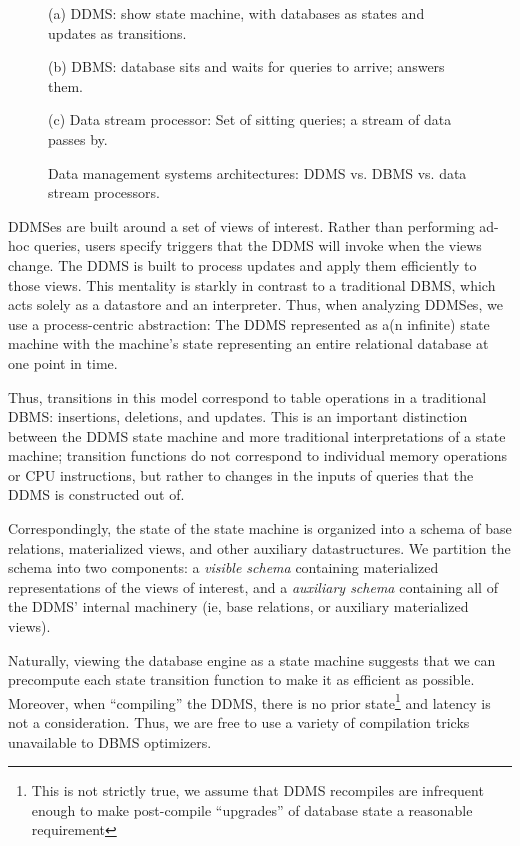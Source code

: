 \begin{figure}
(a) DDMS: show state machine, with databases as states and updates as transitions.

(b) DBMS: database sits and waits for queries to arrive; answers them.

(c) Data stream processor: Set of sitting queries; a stream of data passes by.

\caption{Data management systems architectures: DDMS vs. DBMS vs. data stream processors.}
\end{figure}


DDMSes are built around a set of views of interest.  Rather than performing
ad-hoc queries, users specify triggers that the DDMS will invoke when the views
change.  The DDMS is built to process updates and apply them efficiently to
those views.  This mentality is starkly in contrast to a traditional DBMS, which
acts solely as a datastore and an interpreter.  Thus, when analyzing DDMSes, we
use a process-centric abstraction: The DDMS represented as a(n infinite) state
machine with the machine's state representing an entire relational database at
one point in time.


Thus, transitions in this model correspond to table operations in a traditional
DBMS: insertions, deletions, and updates.  This is an important distinction
between the DDMS state machine and more traditional interpretations of a state
machine; transition functions do not correspond to individual memory operations
or CPU instructions, but rather to changes in the inputs of queries that the
DDMS is constructed out of.

Correspondingly, the state of the state machine is organized into a schema of
base relations, materialized views, and other auxiliary datastructures.  We
partition the schema into two components: a \textit{visible schema} containing
materialized representations of the views of interest, and a \textit{auxiliary
schema} containing all of the DDMS' internal machinery (ie, base relations, or
auxiliary materialized views).


Naturally, viewing the database engine as a state machine suggests that we can
precompute each state transition function to make it as efficient as possible. 
Moreover, when ``compiling'' the DDMS, there is no prior state\footnote{This is
not strictly true, we assume that DDMS recompiles are infrequent enough to make
post-compile ``upgrades'' of database state a reasonable requirement} and
latency is not a consideration.  Thus, we are free to use a variety of
compilation tricks unavailable to DBMS optimizers.


